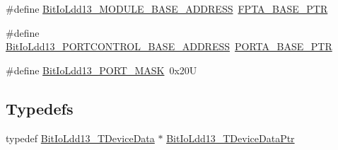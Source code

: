 \begin{DoxyCompactItemize}
\#define \hyperlink{group___bit_io_ldd13__module_ga24513d5e33f57deda7fbc93c09fba642}{Bit\+Io\+Ldd13\+\_\+\+M\+O\+D\+U\+L\+E\+\_\+\+B\+A\+S\+E\+\_\+\+A\+D\+D\+R\+E\+SS}~\hyperlink{group___backward___compatibility___symbols_ga4b0d89f517528ab7c1d2fdefe4c863d8}{F\+P\+T\+A\+\_\+\+B\+A\+S\+E\+\_\+\+P\+TR}
\item 
\#define \hyperlink{group___bit_io_ldd13__module_ga8cba8eb4f6f9c25d4153a4a0af9ace07}{Bit\+Io\+Ldd13\+\_\+\+P\+O\+R\+T\+C\+O\+N\+T\+R\+O\+L\+\_\+\+B\+A\+S\+E\+\_\+\+A\+D\+D\+R\+E\+SS}~\hyperlink{group___p_o_r_t___peripheral_gaa18ec7594fe603225220ec6eda4a19ce}{P\+O\+R\+T\+A\+\_\+\+B\+A\+S\+E\+\_\+\+P\+TR}
\item 
\#define \hyperlink{group___bit_io_ldd13__module_gaf8ce0959b0690e33cf8be60cdbf09829}{Bit\+Io\+Ldd13\+\_\+\+P\+O\+R\+T\+\_\+\+M\+A\+SK}~0x20U
\end{DoxyCompactItemize}
\subsection*{Typedefs}
\begin{DoxyCompactItemize}
\item 
typedef \hyperlink{struct_bit_io_ldd13___t_device_data}{Bit\+Io\+Ldd13\+\_\+\+T\+Device\+Data} $\ast$ \hyperlink{group___bit_io_ldd13__module_ga42e669f48bfa755a4f674b03aa227551}{Bit\+Io\+Ldd13\+\_\+\+T\+Device\+Data\+Ptr}
\end{DoxyCompactItemize}
